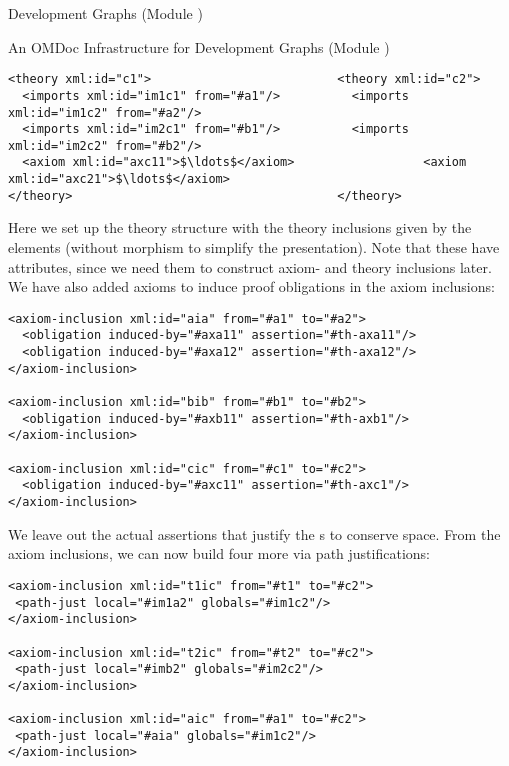 \begin{omgroup}[id=complex-theories,short=Complex Theories,
                            creators=miko,contributors=frabe]
\begin{omgroup}[id=development-graphs,short=Development Graphs]{Development Graphs (Module
  {})}
\begin{module}[id=dgraph]
\begin{omgroup}[id=dg-omdoc,short=OMDoc Development Graphs]{An OMDoc Infrastructure for
  Development Graphs (Module {})}
\begin{lstlisting}[label=lst:thi,mathescape,
                   index={theory,imports,axiom},
                   caption={The {\omdoc} representation of the theories
                   in {\myfigref{thi-proof}}.}]
<theory xml:id="c1">                          <theory xml:id="c2">
  <imports xml:id="im1c1" from="#a1"/>          <imports xml:id="im1c2" from="#a2"/>
  <imports xml:id="im2c1" from="#b1"/>          <imports xml:id="im2c2" from="#b2"/>
  <axiom xml:id="axc11">$\ldots$</axiom>                  <axiom xml:id="axc21">$\ldots$</axiom>
</theory>                                     </theory>
\end{lstlisting}
Here we set up the theory structure with the theory inclusions given by the
{} elements (without morphism to simplify the presentation). Note
that these have {} attributes, since we need them to
construct axiom- and theory inclusions later. We have also added axioms to induce
proof obligations in the axiom inclusions:
\begin{lstlisting}[label=lst:thi-inclusions,
                   index={obligation,axiom-inclusion},
                   caption={The {\omdoc} Representation of the Inclusions
                   in {\myfigref{thi-proof}}.}]
<axiom-inclusion xml:id="aia" from="#a1" to="#a2">
  <obligation induced-by="#axa11" assertion="#th-axa11"/>
  <obligation induced-by="#axa12" assertion="#th-axa12"/>
</axiom-inclusion>

<axiom-inclusion xml:id="bib" from="#b1" to="#b2"> 
  <obligation induced-by="#axb11" assertion="#th-axb1"/>
</axiom-inclusion>

<axiom-inclusion xml:id="cic" from="#c1" to="#c2">
  <obligation induced-by="#axc11" assertion="#th-axc1"/>
</axiom-inclusion>
\end{lstlisting}
We leave out the actual assertions that justify the {s} to conserve
space. From the axiom inclusions, we can now build four more via path justifications:

\begin{lstlisting}[label=lst:thi-induced-inclusions,index={path-just,axiom-inclusion},
                   caption={The Induced Axiom Inclusions in {\myfigref{thi-proof}}.}]
<axiom-inclusion xml:id="t1ic" from="#t1" to="#c2">
 <path-just local="#im1a2" globals="#im1c2"/>
</axiom-inclusion>

<axiom-inclusion xml:id="t2ic" from="#t2" to="#c2">
 <path-just local="#imb2" globals="#im2c2"/>
</axiom-inclusion>

<axiom-inclusion xml:id="aic" from="#a1" to="#c2">
 <path-just local="#aia" globals="#im1c2"/>
</axiom-inclusion>


\end{lstlisting}
\end{omgroup}
\end{module}
\end{omgroup}
\end{omgroup}
